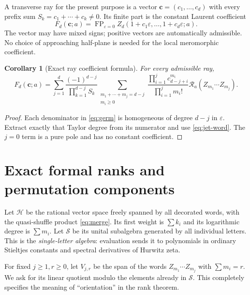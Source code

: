 \documentclass[11pt]{article}
\numberwithin{equation}{section}
\newtheorem{corollary}[theorem]{Corollary}
\theoremstyle{definition}
\newcommand{\R}{\mathcal R}
\newcommand{\SSS}{\mathscr S}
\newcommand{\Alg}{\mathscr H}
\newcommand{\FP}{\operatorname{FP}}
\newcommand{\bbc}{\boldsymbol c}
\begin{document}
A transverse ray for the present purpose is a vector
$\bbc=(c_1,\ldots,c_d)$ with every prefix sum
$S_k=c_1+\cdots+c_k\ne0$. Its finite part is the constant Laurent
coefficient
\[
 F_d(\bbc;a)=\FP_{\varepsilon=0}
       Z_d(1+c_1\varepsilon,\ldots,1+c_d\varepsilon;a).
\]
The vector may have mixed signs; positive vectors are automatically
admissible. No choice of approaching half-plane is needed for the local
meromorphic coefficient.

\begin{corollary}[Exact ray coefficient formula]\label{cor:ray}
For every admissible ray,
\begin{equation}\label{eq:ray}
 F_d(\bbc;a)=\sum_{j=1}^d
 \frac{(-1)^{d-j}}{\prod_{k=1}^{d-j}S_k}
 \sum_{\substack{m_1+\cdots+m_j=d-j\\m_i\ge0}}
 \frac{\prod_{i=1}^j c_{d-j+i}^{m_i}}{\prod_{i=1}^j m_i!}
                      \R_a(Z_{m_1}\cdots Z_{m_j}).
\end{equation}
\end{corollary}
\begin{proof}
Each denominator in \eqref{eq:germ} is homogeneous of degree $d-j$ in
$\varepsilon$. Extract exactly that Taylor degree from its numerator and
use \eqref{eq:jet-word}. The $j=0$ term is a pure pole and has no constant
coefficient.
\end{proof}

\section{Exact formal ranks and permutation components}
\label{sec:ranks}
Let $\Alg$ be the rational vector space freely spanned by all decorated
words, with the quasi-shuffle product \eqref{eq:merge}. Its first weight
is $\sum k_i$ and its logarithmic degree is $\sum m_i$. Let $\SSS$ be
its unital subalgebra generated by all individual letters. This is the
\emph{single-letter algebra}: evaluation sends it to polynomials in
ordinary Stieltjes constants and spectral derivatives of Hurwitz zeta.

For fixed $j\ge1,r\ge0$, let $V_{j,r}$ be the span of the words
$Z_{m_1}\cdots Z_{m_j}$ with $\sum m_i=r$. We ask for its linear quotient
modulo the elements already in $\SSS$. This completely specifies the
meaning of ``orientation'' in the rank theorem.
\end{document}
